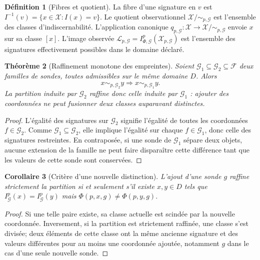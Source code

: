 \documentclass[11pt,oneside]{book}
\newtheorem{theoreme}{Théorème}[chapter]
\newtheorem{corollaire}[theoreme]{Corollaire}
\theoremstyle{definition}
\newtheorem{definition}[theoreme]{Définition}
\theoremstyle{remark}
\newcommand{\X}{\mathcal X}
\newcommand{\Fcal}{\mathcal F}
\newcommand{\Gcal}{\mathcal G}
\newcommand{\Lcal}{\mathcal L}
\newcommand{\1}{\mathbf 1}
\begin{document}
\begin{definition}[Fibres et quotient]
La fibre d'une signature en $v$ est $I^{-1}(v)=\{x\in\X:I(x)=v\}$. Le quotient observationnel $\X/{\sim_{p,\Gcal}}$ est l'ensemble des classes d'indiscernabilité. L'application canonique $q_{p,\Gcal}:\X\to\X/{\sim_{p,\Gcal}}$ envoie $x$ sur sa classe $[x]$. L'image observée $\Lcal_{p,\Gcal}=I_{\Phi,\Gcal}^{p}(\X_{p,\Gcal})$ est l'ensemble des signatures effectivement possibles dans le domaine déclaré.
\end{definition}

\begin{theoreme}[Raffinement monotone des empreintes]
Soient $\Gcal_1\subseteq\Gcal_2\subseteq\Fcal$ deux familles de sondes, toutes admissibles sur le même domaine $D$. Alors
\[
x\sim_{p,\Gcal_2}y\Longrightarrow x\sim_{p,\Gcal_1}y.
\]
La partition induite par $\Gcal_2$ raffine donc celle induite par $\Gcal_1$ : ajouter des coordonnées ne peut fusionner deux classes auparavant distinctes.
\end{theoreme}
\begin{proof}
L'égalité des signatures sur $\Gcal_2$ signifie l'égalité de toutes les coordonnées $f\in\Gcal_2$. Comme $\Gcal_1\subseteq\Gcal_2$, elle implique l'égalité sur chaque $f\in\Gcal_1$, donc celle des signatures restreintes. En contraposée, si une sonde de $\Gcal_1$ sépare deux objets, aucune extension de la famille ne peut faire disparaître cette différence tant que les valeurs de cette sonde sont conservées.
\end{proof}

\begin{corollaire}[Critère d'une nouvelle distinction]
L'ajout d'une sonde $g$ raffine strictement la partition si et seulement s'il existe $x,y\in D$ tels que $I_{\Gcal}^{p}(x)=I_{\Gcal}^{p}(y)$ mais $\Phi(p,x,g)\neq\Phi(p,y,g)$.
\end{corollaire}
\begin{proof}
Si une telle paire existe, sa classe actuelle est scindée par la nouvelle coordonnée. Inversement, si la partition est strictement raffinée, une classe s'est divisée; deux éléments de cette classe ont la même ancienne signature et des valeurs différentes pour au moins une coordonnée ajoutée, notamment $g$ dans le cas d'une seule nouvelle sonde.
\end{proof}
\end{document}
